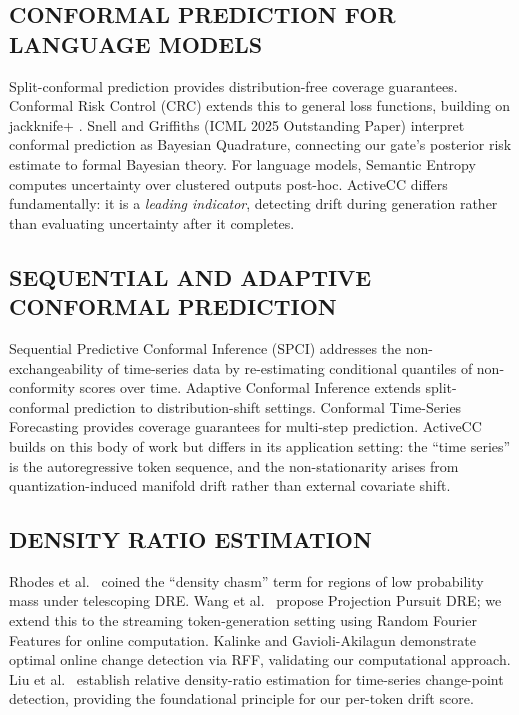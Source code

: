 \documentclass{ieeetmlcn}
\begin{document}
\subsection{CONFORMAL PREDICTION FOR LANGUAGE MODELS}
Split-conformal prediction \cite{vovk2005algorithmic} provides
distribution-free coverage guarantees. Conformal Risk Control (CRC)
\cite{angelopoulos2024conformal} extends this to general loss functions,
building on jackknife+ \cite{barber2021predictive}. Snell and Griffiths
\cite{pmlr-v267-snell25a} (ICML 2025 Outstanding Paper) interpret
conformal prediction as Bayesian Quadrature, connecting our gate's
posterior risk estimate to formal Bayesian theory. For language models,
Semantic Entropy \cite{kuhn2023semantic} computes uncertainty over
clustered outputs post-hoc. ActiveCC differs fundamentally: it is a
\emph{leading indicator}, detecting drift during generation rather than
evaluating uncertainty after it completes.

\subsection{SEQUENTIAL AND ADAPTIVE CONFORMAL PREDICTION}
Sequential Predictive Conformal Inference (SPCI) \cite{pmlr-v202-xu23r}
addresses the non-exchangeability of time-series data by re-estimating
conditional quantiles of non-conformity scores over time. Adaptive
Conformal Inference \cite{gibbs2021adaptive} extends split-conformal
prediction to distribution-shift settings. Conformal Time-Series
Forecasting \cite{NEURIPS2021_312f1ba2} provides coverage
guarantees for multi-step prediction. ActiveCC builds on this body of
work but differs in its application setting: the ``time series'' is the
autoregressive token sequence, and the non-stationarity arises from
quantization-induced manifold drift rather than external covariate
shift.

\subsection{DENSITY RATIO ESTIMATION}
Rhodes et al.\ \cite{NEURIPS2020_33d3b157} coined the ``density chasm''
term for regions of low probability mass under telescoping DRE. Wang et
al.\ \cite{wang2025projection} propose Projection Pursuit DRE; we extend
this to the streaming token-generation setting using Random Fourier
Features \cite{rahimi2007random} for online computation. Kalinke and
Gavioli-Akilagun \cite{kalinke2025optimal} demonstrate optimal online
change detection via RFF, validating our computational approach. Liu et
al.\ \cite{LIU201372} establish relative density-ratio estimation for
time-series change-point detection, providing the foundational principle
for our per-token drift score.
\end{document}
